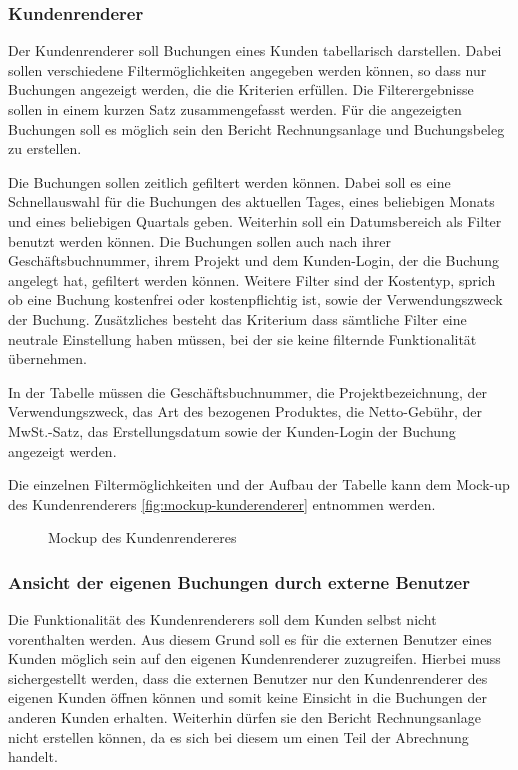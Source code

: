 \subsubsection{Kundenrenderer}
Der Kundenrenderer soll Buchungen eines Kunden tabellarisch darstellen.
Dabei sollen verschiedene Filtermöglichkeiten angegeben werden können, so dass nur Buchungen angezeigt werden, die die Kriterien erfüllen.
Die Filterergebnisse sollen in einem kurzen Satz zusammengefasst werden.
Für die angezeigten Buchungen soll es möglich sein den Bericht Rechnungsanlage und Buchungsbeleg zu erstellen.

Die Buchungen sollen zeitlich gefiltert werden können.
Dabei soll es eine Schnellauswahl für die Buchungen des aktuellen Tages, eines beliebigen Monats und eines beliebigen Quartals geben.
Weiterhin soll ein Datumsbereich als Filter benutzt werden können.
Die Buchungen sollen auch nach ihrer Geschäftsbuchnummer, ihrem Projekt und dem Kunden-Login, der die Buchung angelegt hat, gefiltert werden können.
Weitere Filter sind der Kostentyp, sprich ob eine Buchung kostenfrei oder kostenpflichtig ist, sowie der Verwendungszweck der Buchung. Zusätzliches besteht das Kriterium dass sämtliche Filter eine neutrale Einstellung haben müssen, bei der sie keine filternde Funktionalität übernehmen.

In der Tabelle müssen die Geschäftsbuchnummer, die Projektbezeichnung, der Verwendungszweck, das Art des bezogenen Produktes, die Netto-Gebühr, der MwSt.-Satz, das Erstellungsdatum sowie der Kunden-Login der Buchung angezeigt werden.

Die einzelnen Filtermöglichkeiten und der Aufbau der Tabelle kann dem Mock-up des Kundenrenderers \vref{fig:mockup-kunderenderer} entnommen werden.

\begin{figure}[htb]
	\centering
	\caption{Mockup des Kundenrendereres}
	\label{fig:mockup-kunderenderer}
\end{figure}

\subsubsection{Ansicht der eigenen Buchungen durch externe Benutzer} \label{subsubsec:ansicht_externe_benutzer}
Die Funktionalität des Kundenrenderers soll dem Kunden selbst nicht vorenthalten werden.
Aus diesem Grund soll es für die externen Benutzer eines Kunden möglich sein auf den eigenen Kundenrenderer zuzugreifen.
Hierbei muss sichergestellt werden, dass die externen Benutzer nur den Kundenrenderer des eigenen Kunden öffnen können und somit keine Einsicht in die Buchungen der anderen Kunden erhalten. 
Weiterhin dürfen sie den Bericht Rechnungsanlage nicht erstellen können, da es sich bei diesem um einen Teil der Abrechnung handelt.

